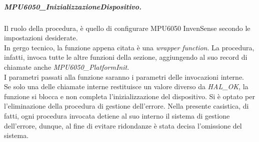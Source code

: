 \subparagraph{MPU6050\_InizializzazioneDispositivo.}
Il ruolo della procedura, è quello di configurare MPU6050 InvenSense secondo le impostazioni desiderate.\\
In gergo tecnico, la funzione appena citata è una \textit{wrapper function}. La procedura, infatti, invoca tutte le altre funzioni della sezione, aggiungendo al suo record di chiamate anche \textit{MPU6050\_PlatformInit}.\\
I parametri passati alla funzione saranno i parametri delle invocazioni interne.\\
Se solo una delle chiamate interne restituisce un valore diverso da \textit{HAL\_OK}, la funzione si blocca e non completa l'inizializzazione del dispositivo.
Si è optato per l'eliminazione della procedura di gestione dell'errore. Nella presente casistica, di fatti, ogni procedura invocata detiene al suo interno il sistema di gestione dell'errore, dunque, al fine di evitare ridondanze è stata decisa l'omissione del sistema.
\newpage


